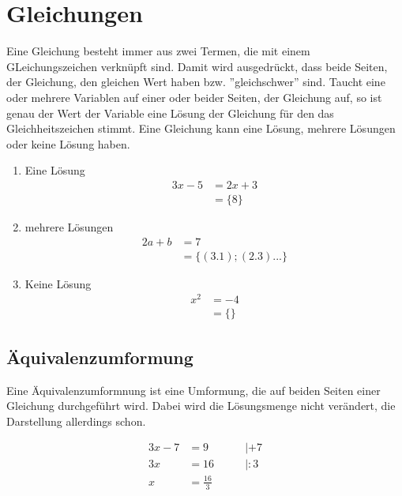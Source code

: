 \section{Gleichungen}\label{sec:Gleichungen}
 Eine Gleichung besteht immer aus zwei Termen, die mit einem GLeichungszeichen verknüpft sind. Damit wird ausgedrückt, dass beide Seiten, der Gleichung, den gleichen Wert haben bzw. ''gleichschwer'' sind. Taucht eine oder mehrere Variablen auf einer oder beider Seiten, der Gleichung auf, so ist genau der Wert der Variable eine Lösung der Gleichung für den das Gleichheitszeichen stimmt. 
Eine Gleichung kann eine Lösung, mehrere Lösungen oder keine Lösung haben. 

\begin{beispiel}
	\begin{enumerate}
		\item Eine Lösung 
			\begin{align*}
				3x-5&=2x+3\\
				&=\{8\}
			\end{align*}
		\item mehrere Lösungen 
			\begin{align*}
				2a+b&=7\\
				&=\{(3.1);(2.3)...\}
			\end{align*}
		\item Keine Lösung
			\begin{align*}
				x^2&=-4\\
				&=\{\}
			\end{align*}
	\end{enumerate}
\end{beispiel}
\subsection{Äquivalenzumformung}\label{sec:Gleichungen/Aequivalenzumformung}
Eine Äquivalenzumformnung ist eine Umformung, die auf beiden Seiten einer Gleichung durchgeführt wird. Dabei wird die Lösungsmenge nicht verändert, die Darstellung allerdings schon.

\begin{beispiel}
	\begin{alignat*}
		3x-7&=9\qquad &| +7\\
		3x&=16 \qquad &|:3\\
		x&=\frac{16}{3}
	\end{alignat*}
\end{beispiel}
